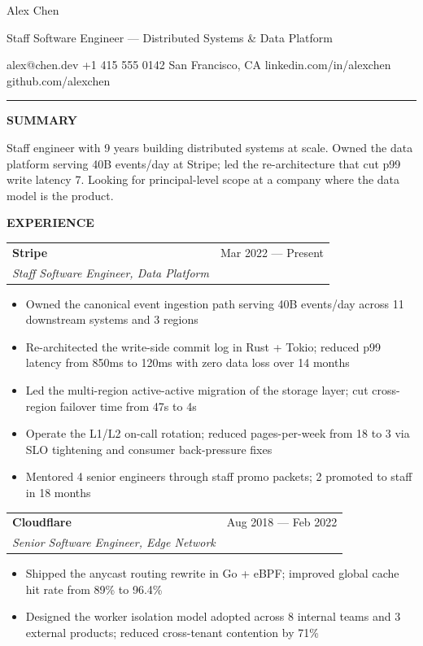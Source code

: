\documentclass[letterpaper,10.5pt]{article}
\makeatletter
\newcommand{\sectionhead}[1]{%
  \vspace{14pt}%
  {\bfseries\fontsize{9}{11}\selectfont\textcolor{mintext}{\MakeUppercase{#1}}}%
  \vspace{8pt}%
}
\newcommand{\role}[3]{%
  \begin{tabularx}{\linewidth}{@{}Xr@{}}
    \textbf{#1} & \textcolor{minsec}{#3} \\
    \textit{#2} & \\
  \end{tabularx}
  \vspace{4pt}
}
\makeatother
\begin{document}
{\selectfont\fontsize{28}{32}\selectfont\textcolor{mintext}{Alex Chen}}

\vspace{2pt}
{\fontsize{11}{14}\selectfont\textcolor{minsec}{Staff Software Engineer --- Distributed Systems \& Data Platform}}

\vspace{6pt}
{\fontsize{10.5}{15}\selectfont\textcolor{mintext}{alex@chen.dev \textperiodcentered{} +1 415 555 0142 \textperiodcentered{} San Francisco, CA \textperiodcentered{} linkedin.com/in/alexchen \textperiodcentered{} github.com/alexchen}}

\vspace{6pt}
\noindent\textcolor{mintext}{\rule{\linewidth}{0.5pt}}
\vspace{6pt}

\sectionhead{Summary}
Staff engineer with 9 years building distributed systems at scale. Owned the data platform serving 40B events/day at Stripe; led the re-architecture that cut p99 write latency 7\texttimes{}. Looking for principal-level scope at a company where the data model is the product.

\sectionhead{Experience}

\role{Stripe}{Staff Software Engineer, Data Platform}{Mar 2022 --- Present}
\begin{itemize}
  \item Owned the canonical event ingestion path serving 40B events/day across 11 downstream systems and 3 regions
  \item Re-architected the write-side commit log in Rust + Tokio; reduced p99 latency from 850ms to 120ms with zero data loss over 14 months
  \item Led the multi-region active-active migration of the storage layer; cut cross-region failover time from 47s to 4s
  \item Operate the L1/L2 on-call rotation; reduced pages-per-week from 18 to 3 via SLO tightening and consumer back-pressure fixes
  \item Mentored 4 senior engineers through staff promo packets; 2 promoted to staff in 18 months
\end{itemize}

\vspace{6pt}
\role{Cloudflare}{Senior Software Engineer, Edge Network}{Aug 2018 --- Feb 2022}
\begin{itemize}
  \item Shipped the anycast routing rewrite in Go + eBPF; improved global cache hit rate from 89\% to 96.4\%
  \item Designed the worker isolation model adopted across 8 internal teams and 3 external products; reduced cross-tenant contention by 71\%
\end{itemize}
\end{document}
